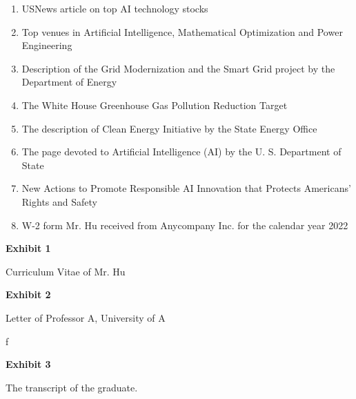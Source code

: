\documentclass{article}
\begin{document}
\begin{enumerate}[label={Exhibit \arabic*:}]
    \item USNews article on top AI technology stocks 
    \item Top venues in Artificial Intelligence, Mathematical Optimization and Power Engineering 
    \item Description of the Grid Modernization and the Smart Grid project by the Department of Energy 
    \item The White House Greenhouse Gas Pollution Reduction Target 
    \item The description of Clean Energy Initiative by the State Energy Office 
    \item The page devoted to Artificial Intelligence (AI) by the U. S. Department of State
    \item New Actions to Promote Responsible AI Innovation that Protects Americans’ Rights and Safety 
    \item W-2 form Mr. Hu received from Anycompany Inc. for the calendar year 2022
\end{enumerate}

\clearpage

\vspace*{\fill}
\begin{center}

{\LARGE \bf
Exhibit 1
}

\vspace{10\baselineskip}

{\large Curriculum Vitae of Mr. Hu}

\end{center}
\vspace*{\fill}

% 

\vspace*{\fill}
\begin{center}

{\LARGE \bf
Exhibit 2
}

\vspace{10\baselineskip}

{\large Letter of Professor A, University of A}

\end{center}
\vspace*{\fill}
f
% 

\vspace*{\fill}
\begin{center}

{\LARGE \bf
Exhibit 3
}

\vspace{10\baselineskip}

{\large The transcript of the graduate.}

\end{center}
\vspace*{\fill}
\end{document}
